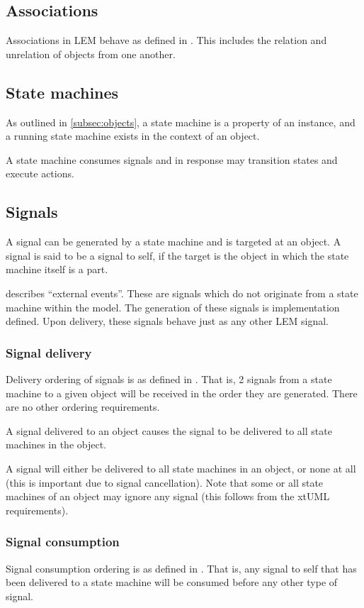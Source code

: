\subsection{Associations}
\label{sec:relateAction}

Associations in LEM behave as defined in \cite{mellor:2002}. This includes
the relation and unrelation of objects from one another.

\subsection{State machines}
As outlined in \ref{subsec:objects}, a state machine is a property of an
instance, and a running state machine exists in the context of an object.

A state machine consumes signals and in response may transition states and
execute actions.

\subsection{Signals}
\label{subsec:signals}
A signal can be generated by a state machine and is targeted at an object.
A signal is said to be a \textsf{signal to self}, if the target is the object in
which the state machine itself is a part.

\cite{mellor:2002} describes ``external events''. These are signals which do not
originate from a state machine within the model. The generation of these signals
is implementation defined. Upon delivery, these signals behave just as any other
LEM signal.

\subsubsection{Signal delivery}
Delivery ordering of signals is as defined in \cite{mellor:2002}. That is, 2
signals from a state machine to a given object will be received in the order
they are generated. There are no other ordering requirements.

A signal delivered to an object causes the signal to be delivered to all
state machines in the object.

A signal will either be delivered to all state machines in an object, or
none at all (this is important due to signal cancellation). Note that some
or all state machines of an object may ignore any signal (this follows
from the xtUML requirements).

\subsubsection{Signal consumption}
Signal consumption ordering is as defined in \cite{mellor:2002}. That is, any
\textsf{signal to self} that has been delivered to a state machine will be
consumed before any other type of signal.

